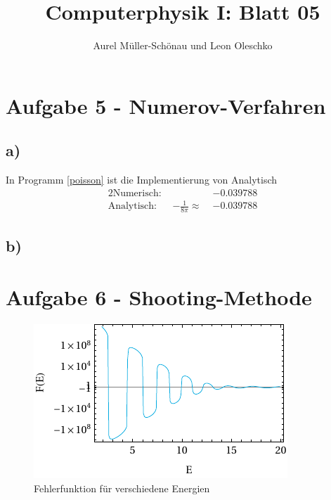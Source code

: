 


\setcounter{secnumdepth}{0}



\title{Computerphysik I: Blatt 05}
\author{Aurel Müller-Schönau und Leon Oleschko}
\maketitle

\section{Aufgabe 5 - Numerov-Verfahren}
\subsection{a)}
In Programm \ref{poisson} ist die Implementierung von 
Analytisch
\begin{alignat}{2}
	\text{Numerisch: }&& -0.039788\\
	\text{Analytisch: }&-\frac{1}{8\pi} \approx\;& -0.039788
\end{alignat}

\subsection{b)}

\section{Aufgabe 6 - Shooting-Methode}

\begin{figure}[h!]
	\centering
	\includegraphics[scale = 1.388888888]{img/errorFunction.pdf}
	\caption{Fehlerfunktion für verschiedene Energien}
	\label{fig:shooting}
\end{figure}

